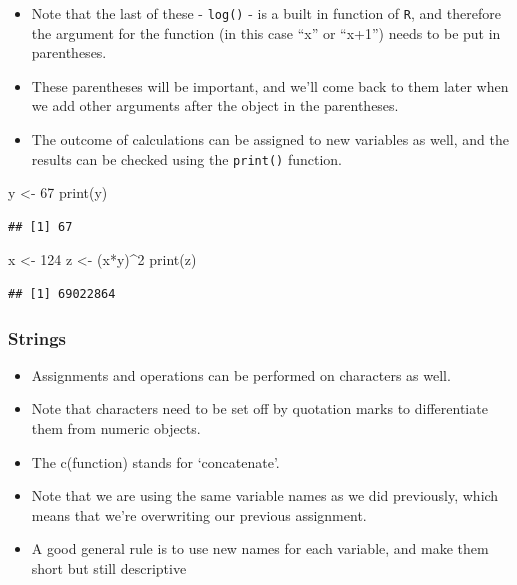 \documentclass[
]{book}
\newenvironment{Shaded}{\begin{snugshade}}{\end{snugshade}}
\newcommand{\DecValTok}[1]{\textcolor[rgb]{0.00,0.00,0.81}{#1}}
\newcommand{\FunctionTok}[1]{\textcolor[rgb]{0.00,0.00,0.00}{#1}}
\newcommand{\NormalTok}[1]{#1}
\newcommand{\OtherTok}[1]{\textcolor[rgb]{0.56,0.35,0.01}{#1}}
\newcommand{\SpecialCharTok}[1]{\textcolor[rgb]{0.00,0.00,0.00}{#1}}
\begin{document}
\begin{itemize}
\item
  Note that the last of these - \texttt{log()} - is a built in function of \texttt{R}, and therefore the argument for the function (in this case ``x'' or ``x+1'') needs to be put in parentheses.
\item
  These parentheses will be important, and we'll come back to them later when we add other arguments after the object in the parentheses.
\item
  The outcome of calculations can be assigned to new variables as well, and the results can be checked using the \texttt{print()} function.
\end{itemize}

\begin{Shaded}
\begin{Highlighting}[]
\NormalTok{y }\OtherTok{\textless{}{-}} \DecValTok{67}
\FunctionTok{print}\NormalTok{(y)}
\end{Highlighting}
\end{Shaded}

\begin{verbatim}
## [1] 67
\end{verbatim}

\begin{Shaded}
\begin{Highlighting}[]
\NormalTok{x }\OtherTok{\textless{}{-}} \DecValTok{124}
\NormalTok{z }\OtherTok{\textless{}{-}}\NormalTok{ (x}\SpecialCharTok{*}\NormalTok{y)}\SpecialCharTok{\^{}}\DecValTok{2}
\FunctionTok{print}\NormalTok{(z)}
\end{Highlighting}
\end{Shaded}

\begin{verbatim}
## [1] 69022864
\end{verbatim}

\hypertarget{strings}{%
\subsubsection{Strings}\label{strings}}

\begin{itemize}
\item
  Assignments and operations can be performed on characters as well.
\item
  Note that characters need to be set off by quotation marks to differentiate them from numeric objects.
\item
  The c(function) stands for `concatenate'.
\item
  Note that we are using the same variable names as we did previously, which means that we're overwriting our previous assignment.
\item
  A good general rule is to use new names for each variable, and make them short but still descriptive
\end{itemize}
\end{document}
